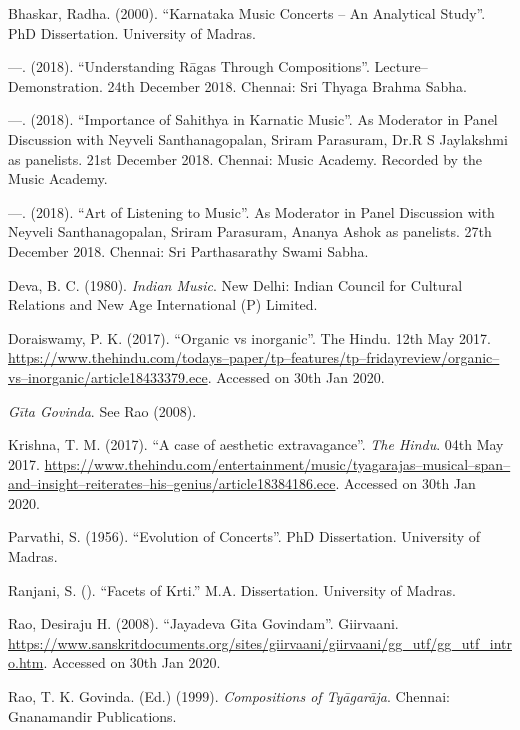 \begin{thebibliography}{99}
 Bhaskar, Radha. (2000). “Karnataka Music Concerts – An Analytical Study”. PhD Dissertation. University of Madras.

  —. (2018). “Understanding Rāgas Through Compositions”. Lecture–Demonstration. 24th December 2018. Chennai: Sri Thyaga Brahma Sabha.

  —. (2018). “Importance of Sahithya in Karnatic Music”. As Moderator in Panel Discussion with Neyveli Santhanagopalan, Sriram Parasuram, Dr.R S Jaylakshmi as panelists. 21st December 2018. Chennai: Music Academy. Recorded by the Music Academy.

  —. (2018). “Art of Listening to Music”. As Moderator in Panel Discussion with Neyveli Santhanagopalan, Sriram Parasuram, Ananya Ashok as panelists. 27th December 2018. Chennai: Sri Parthasarathy Swami Sabha.

  Deva, B. C. (1980). \textit{Indian Music}. New Delhi: Indian Council for Cultural Relations and New Age International (P) Limited.

  Doraiswamy, P. K. (2017). “Organic vs inorganic”. The Hindu. 12th May 2017. \url{https://www.thehindu.com/todays–paper/tp–features/tp–fridayreview/organic–vs–inorganic/article18433379.ece}. Accessed on 30th Jan 2020.

  \textit{Gīta Govinda}. See Rao (2008).

  Krishna, T. M. (2017). “A case of aesthetic extravagance”. \textit{The Hindu}. 04th May 2017. \url{https://www.thehindu.com/entertainment/music/tyagarajas–musical–span–and–insight–reiterates–his–genius/article18384186.ece}. Accessed on 30th Jan 2020.

  Parvathi, S. (1956). “Evolution of Concerts”. PhD Dissertation. University of Madras.

  Ranjani, S. (). “Facets of Krti.” M.A. Dissertation. University of Madras.

  Rao, Desiraju H. (2008). “Jayadeva Gita Govindam”. Giirvaani. \url{https://www.sanskritdocuments.org/sites/giirvaani/giirvaani/gg_utf/gg_utf_intro.htm}. Accessed on 30th Jan 2020.

  Rao, T. K. Govinda. (Ed.) (1999). \textit{Compositions of Tyāgarāja}. Chennai: Gnanamandir Publications.


\end{thebibliography}

